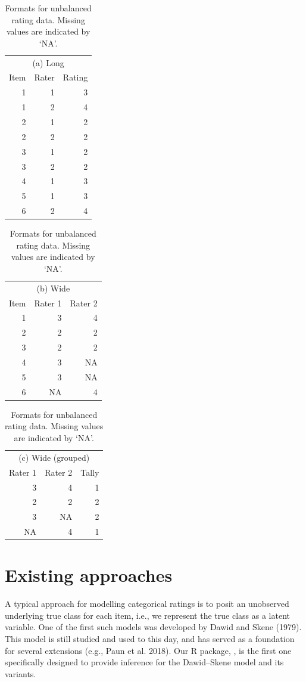 \begin{table}
\caption{\label{tab:data-formats-unbalanced}Formats for unbalanced rating data. Missing values are indicated by ‘NA’.}

\begin{tabular}[t]{rrr}
\toprule
\multicolumn{3}{c}{(a) Long} \\
\cmidrule(l{3pt}r{3pt}){1-3}
Item & Rater & Rating\\
\midrule
1 & 1 & 3\\
1 & 2 & 4\\
2 & 1 & 2\\
2 & 2 & 2\\
3 & 1 & 2\\
3 & 2 & 2\\
4 & 1 & 3\\
5 & 1 & 3\\
6 & 2 & 4\\
\bottomrule
\end{tabular}
\begin{tabular}[t]{rrr}
\toprule
\multicolumn{3}{c}{(b) Wide} \\
\cmidrule(l{3pt}r{3pt}){1-3}
Item & Rater 1 & Rater 2\\
\midrule
1 & 3 & 4\\
2 & 2 & 2\\
3 & 2 & 2\\
4 & 3 & NA\\
5 & 3 & NA\\
6 & NA & 4\\
\bottomrule
\end{tabular}
\begin{tabular}[t]{rrr}
\toprule
\multicolumn{3}{c}{(c) Wide (grouped)} \\
\cmidrule(l{3pt}r{3pt}){1-3}
Rater 1 & Rater 2 & Tally\\
\midrule
3 & 4 & 1\\
2 & 2 & 2\\
3 & NA & 2\\
NA & 4 & 1\\
\bottomrule
\end{tabular}
\end{table}

\hypertarget{sec:existing-approaches}{%
\section{Existing approaches}\label{sec:existing-approaches}}

A typical approach for modelling categorical ratings is to posit an unobserved underlying
true class for each item, i.e., we represent the true class as
a latent variable. One of the first such models was developed by
Dawid and Skene (1979). This model is still studied and used to this day, and has
served as a foundation for several extensions (e.g., Paun et al. 2018). Our
R package, , is the first one specifically designed to provide
inference for the Dawid--Skene model and its variants.

